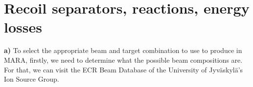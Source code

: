 \section{Recoil separators, reactions, energy losses}

\textbf{a)} To select the appropriate beam and target combination to use to produce  in MARA, firstly, we need to determine what the possible beam compositions are. For that, we can visit the ECR Beam Database \cite{beams} of the University of Jyväskylä's Ion Source Group.